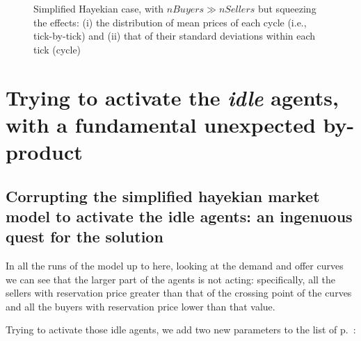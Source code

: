 \documentclass[10pt]{report}
\begin{document}
\begin{appendices}
\begin{figure}[H]
\begin{center}
\caption{Simplified Hayekian case, with $nBuyers \gg nSellers$ but squeezing the effects: (i) the distribution of mean prices of each cycle (i.e., tick-by-tick) and (ii) that of their standard deviations within each tick (cycle)}
\label{output_3_3bbb.png}
\end{center}
\end{figure}


\chapter{Trying to activate the \emph{idle} agents, with a fundamental unexpected by-product}\label{Activating idle agents}
\thispagestyle{fancy}

\section{Corrupting the simplified hayekian market model to activate the idle agents: an ingenuous quest for the solution}\label{Corrupting the simplified hayekian - base}

In all the runs of the model up to here, looking at the demand and offer curves we can see that the larger part of the agents is not acting: specifically, all the sellers with reservation price greater than that of the crossing point of the curves and all the buyers with reservation price lower than that value.

Trying to activate those idle agents, we add two new parameters to the list of p.~\pageref{parameters}:


\end{appendices}
\end{document}
